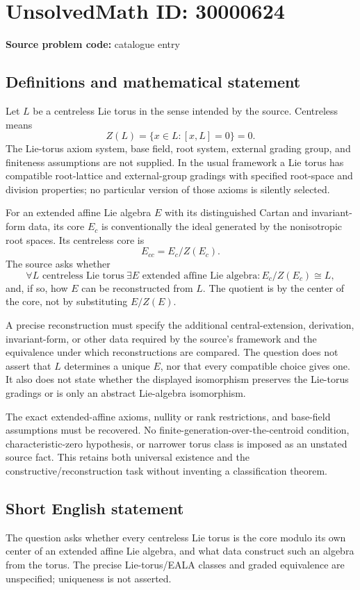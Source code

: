 \documentclass[11pt]{article}
\begin{document}
\section*{UnsolvedMath ID: 30000624}
\textbf{Source problem code:} catalogue entry
\subsection{Definitions and mathematical statement}
Let $L$ be a centreless Lie torus in the sense intended by the source. Centreless means
\[
 Z(L)=\{x\in L:[x,L]=0\}=0.
\]
The Lie-torus axiom system, base field, root system, external grading group, and finiteness assumptions are not supplied. In the usual framework a Lie torus has compatible root-lattice and external-group gradings with specified root-space and division properties; no particular version of those axioms is silently selected.

For an extended affine Lie algebra $E$ with its distinguished Cartan and invariant-form data, its core $E_c$ is conventionally the ideal generated by the nonisotropic root spaces. Its centreless core is
\[
 E_{cc}=E_c/Z(E_c).
\]
The source asks whether
\[
 \forall L\text{ centreless Lie torus}\ \exists E\text{ extended affine Lie algebra}:
       E_c/Z(E_c)\cong L,
\]
and, if so, how $E$ can be reconstructed from $L$. The quotient is by the center of the core, not by substituting $E/Z(E)$.

A precise reconstruction must specify the additional central-extension, derivation, invariant-form, or other data required by the source's framework and the equivalence under which reconstructions are compared. The question does not assert that $L$ determines a unique $E$, nor that every compatible choice gives one. It also does not state whether the displayed isomorphism preserves the Lie-torus gradings or is only an abstract Lie-algebra isomorphism.

The exact extended-affine axioms, nullity or rank restrictions, and base-field assumptions must be recovered. No finite-generation-over-the-centroid condition, characteristic-zero hypothesis, or narrower torus class is imposed as an unstated source fact. This retains both universal existence and the constructive/reconstruction task without inventing a classification theorem.
\subsection{Short English statement}
The question asks whether every centreless Lie torus is the core modulo its own center of an extended affine Lie algebra, and what data construct such an algebra from the torus. The precise Lie-torus/EALA classes and graded equivalence are unspecified; uniqueness is not asserted.
\end{document}
